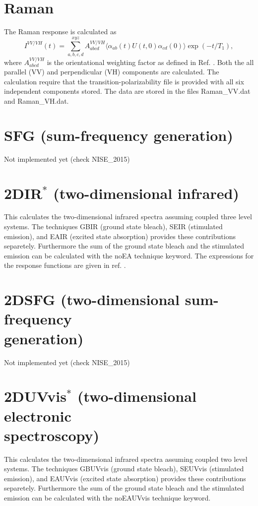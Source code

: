 \section{Raman}
The Raman response is calculated as \cite{Torii.2002.J.Phys.Chem.A.106.3281,Shi.2012.J.Phys.Chem.B.116.13821}
\begin{equation}
        I^{VV/VH}(t)=\sum_{a,b,c,d}^{xyz}A^{VV/VH}_{abcd}\langle\alpha_{ab}(t)U(t,0)\alpha_{cd}(0)\rangle\exp(-t/T_1),
\end{equation}
where $A^{VV/VH}_{abcd}$ is the orientational weighting factor as defined in Ref. . 
Both the all parallel (VV) and perpendicular (VH) components are calculated. The calculation require that the transition-polarizability file is provided with all six independent components stored. The data are stored in the files Raman\_VV.dat and Raman\_VH.dat.
\section{SFG (sum-frequency generation)}
Not implemented yet (check NISE\_2015)
\section{2DIR$^{*}$ (two-dimensional infrared)}
This calculates the two-dimensional infrared spectra assuming coupled three level systems. The techniques GBIR (ground state bleach), SEIR (stimulated emission), and EAIR (excited state absorption) provides these contributions separetely. Furthermore the sum of the ground state bleach and the stimulated emission can be calculated with the noEA technique keyword. The expressions for the response functions are given in ref. \cite{Jansen.2006.JPCB.110.22910}.
\section{2DSFG (two-dimensional sum-frequency\\ generation)}
 Not implemented yet (check NISE\_2015)
\section{2DUVvis$^{*}$ (two-dimensional electronic\\ spectroscopy)}
This calculates the two-dimensional infrared spectra assuming coupled two level systems. The techniques GBUVvis (ground state bleach), SEUVvis (stimulated emission), and EAUVvis (excited state absorption) provides these contributions separetely. Furthermore the sum of the ground state bleach and the stimulated emission can be calculated with the noEAUVvis technique keyword. 
